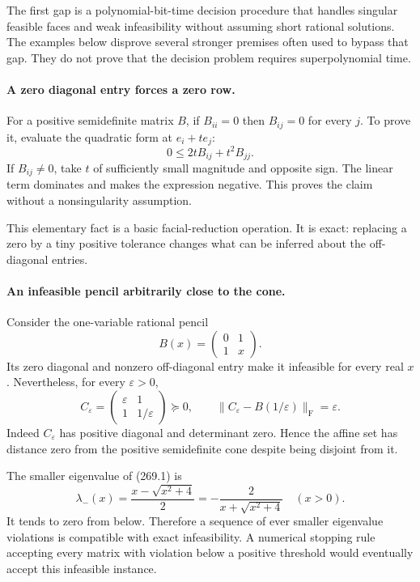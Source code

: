 \documentclass[11pt]{article}
\begin{document}
The first gap is a polynomial-bit-time decision procedure that handles singular feasible faces and weak infeasibility without assuming short rational solutions. The examples below disprove several stronger premises often used to bypass that gap. They do not prove that the decision problem requires superpolynomial time.

\paragraph{A zero diagonal entry forces a zero row.}
For a positive semidefinite matrix $B$, if $B_{ii}=0$ then $B_{ij}=0$ for every $j$. To prove it, evaluate the quadratic form at $e_i+te_j$:
\[
 0\le 2tB_{ij}+t^2B_{jj}.
\]
If $B_{ij}\ne0$, take $t$ of sufficiently small magnitude and opposite sign. The linear term dominates and makes the expression negative. This proves the claim without a nonsingularity assumption.

This elementary fact is a basic facial-reduction operation. It is exact: replacing a zero by a tiny positive tolerance changes what can be inferred about the off-diagonal entries.

\paragraph{An infeasible pencil arbitrarily close to the cone.}
Consider the one-variable rational pencil
\[
 B(x)=\begin{pmatrix}0&1\\1&x\end{pmatrix}.
 \tag{269.1}
\]
Its zero diagonal and nonzero off-diagonal entry make it infeasible for every real $x$. Nevertheless, for every $\varepsilon>0$,
\[
 C_\varepsilon=
 \begin{pmatrix}\varepsilon&1\\1&1/\varepsilon\end{pmatrix}
 \succeq0,\qquad
 \|C_\varepsilon-B(1/\varepsilon)\|_{\mathrm F}=\varepsilon.
\]
Indeed $C_\varepsilon$ has positive diagonal and determinant zero. Hence the affine set has distance zero from the positive semidefinite cone despite being disjoint from it.

The smaller eigenvalue of (269.1) is
\[
 \lambda_-(x)=\frac{x-\sqrt{x^2+4}}2
            =-\frac{2}{x+\sqrt{x^2+4}}
 \quad(x>0).
\]
It tends to zero from below. Therefore a sequence of ever smaller eigenvalue violations is compatible with exact infeasibility. A numerical stopping rule accepting every matrix with violation below a positive threshold would eventually accept this infeasible instance.
\end{document}
